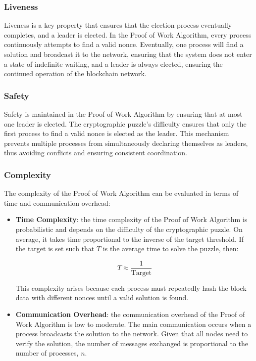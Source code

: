 \subsubsection{Liveness}

Liveness is a key property that ensures that the election process eventually completes, and a leader is elected. In the Proof of Work Algorithm, every process continuously attempts to find a valid nonce. Eventually, one process will find a solution and broadcast it to the network, ensuring that the system does not enter a state of indefinite waiting, and a leader is always elected, ensuring the continued operation of the blockchain network.

\subsubsection{Safety}

Safety is maintained in the Proof of Work Algorithm by ensuring that at most one leader is elected. The cryptographic puzzle's difficulty ensures that only the first process to find a valid nonce is elected as the leader. This mechanism prevents multiple processes from simultaneously declaring themselves as leaders, thus avoiding conflicts and ensuring consistent coordination.

\subsubsection{Complexity}

The complexity of the Proof of Work Algorithm can be evaluated in terms of time and communication overhead:

\begin{itemize}
    \item \textbf{Time Complexity}: the time complexity of the Proof of Work Algorithm is probabilistic and depends on the difficulty of the cryptographic puzzle. On average, it takes time proportional to the inverse of the target threshold. If the target is set such that \(T\) is the average time to solve the puzzle, then:

\[
T \approx \frac{1}{\text{Target}}
\]

This complexity arises because each process must repeatedly hash the block data with different nonces until a valid solution is found.
    \item \textbf{Communication Overhead}: the communication overhead of the Proof of Work Algorithm is low to moderate. The main communication occurs when a process broadcasts the solution to the network. Given that all nodes need to verify the solution, the number of messages exchanged is proportional to the number of processes, \(n\).
\end{itemize}

